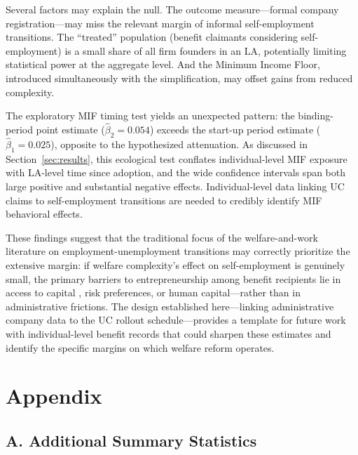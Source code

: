 \documentclass[12pt]{article}
\begin{document}
Several factors may explain the null. The outcome measure---formal company registration---may miss the relevant margin of informal self-employment transitions. The ``treated'' population (benefit claimants considering self-employment) is a small share of all firm founders in an LA, potentially limiting statistical power at the aggregate level. And the Minimum Income Floor, introduced simultaneously with the simplification, may offset gains from reduced complexity.

The exploratory MIF timing test yields an unexpected pattern: the binding-period point estimate ($\hat{\beta}_2 = 0.054$) exceeds the start-up period estimate ($\hat{\beta}_1 = 0.025$), opposite to the hypothesized attenuation. As discussed in Section~\ref{sec:results}, this ecological test conflates individual-level MIF exposure with LA-level time since adoption, and the wide confidence intervals span both large positive and substantial negative effects. Individual-level data linking UC claims to self-employment transitions are needed to credibly identify MIF behavioral effects.

These findings suggest that the traditional focus of the welfare-and-work literature on employment-unemployment transitions \citep{moffitt2002welfare, blundell2006earned} may correctly prioritize the extensive margin: if welfare complexity's effect on self-employment is genuinely small, the primary barriers to entrepreneurship among benefit recipients lie in access to capital \citep{hurst2004liquidity}, risk preferences, or human capital---rather than in administrative frictions. The design established here---linking administrative company data to the UC rollout schedule---provides a template for future work with individual-level benefit records that could sharpen these estimates and identify the specific margins on which welfare reform operates.

\label{apep_main_text_end}



\newpage
\appendix
\section*{Appendix}
\renewcommand{\thefigure}{A\arabic{figure}}
\renewcommand{\thetable}{A\arabic{table}}
\setcounter{figure}{0}
\setcounter{table}{0}

\subsection*{A. Additional Summary Statistics}
\end{document}
